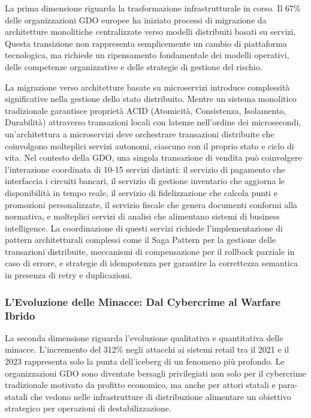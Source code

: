 La prima dimensione riguarda la trasformazione infrastrutturale in corso. Il 67\% delle organizzazioni GDO europee ha iniziato processi di migrazione da architetture monolitiche centralizzate verso modelli distribuiti basati su servizi\autocite{gartner2024cloud}. Questa transizione non rappresenta semplicemente un cambio di piattaforma tecnologica, ma richiede un ripensamento fondamentale dei modelli operativi, delle competenze organizzative e delle strategie di gestione del rischio.

La migrazione verso architetture basate su microservizi introduce complessità significative nella gestione dello stato distribuito. Mentre un sistema monolitico tradizionale garantisce proprietà ACID (Atomicità, Consistenza, Isolamento, Durabilità) attraverso transazioni locali con latenze nell'ordine dei microsecondi, un'architettura a microservizi deve orchestrare transazioni distribuite che coinvolgono molteplici servizi autonomi, ciascuno con il proprio stato e ciclo di vita. Nel contesto della GDO, una singola transazione di vendita può coinvolgere l'interazione coordinata di 10-15 servizi distinti: il servizio di pagamento che interfaccia i circuiti bancari, il servizio di gestione inventario che aggiorna le disponibilità in tempo reale, il servizio di fidelizzazione che calcola punti e promozioni personalizzate, il servizio fiscale che genera documenti conformi alla normativa, e molteplici servizi di analisi che alimentano sistemi di business intelligence. La coordinazione di questi servizi richiede l'implementazione di pattern architetturali complessi come il Saga Pattern per la gestione delle transazioni distribuite, meccanismi di compensazione per il rollback parziale in caso di errore, e strategie di idempotenza per garantire la correttezza semantica in presenza di retry e duplicazioni.

\subsubsection{L'Evoluzione delle Minacce: Dal Cybercrime al Warfare Ibrido}

La seconda dimensione riguarda l'evoluzione qualitativa e quantitativa delle minacce. L'incremento del 312\% negli attacchi ai sistemi retail tra il 2021 e il 2023\autocite{enisa2024retail} rappresenta solo la punta dell'iceberg di un fenomeno più profondo. Le organizzazioni GDO sono diventate bersagli privilegiati non solo per il cybercrime tradizionale motivato da profitto economico, ma anche per attori statali e para-statali che vedono nelle infrastrutture di distribuzione alimentare un obiettivo strategico per operazioni di destabilizzazione.

